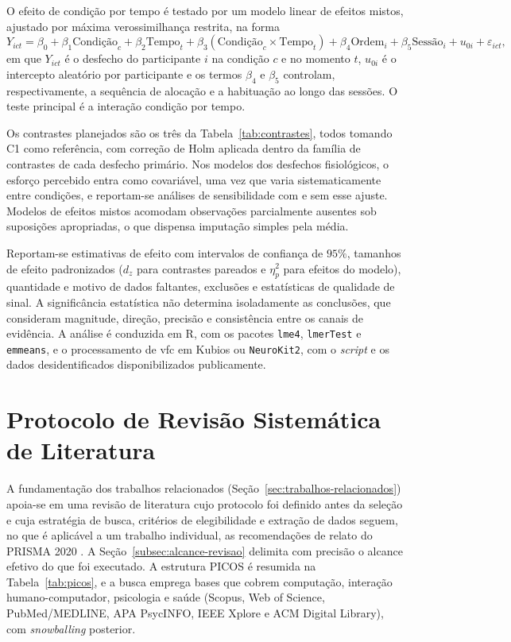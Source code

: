O efeito de condição por tempo é testado por um modelo linear de efeitos mistos, ajustado por máxima verossimilhança restrita, na forma
\begin{equation}
    Y_{ict} = \beta_0 + \beta_1 \mathrm{Condição}_c + \beta_2 \mathrm{Tempo}_t + \beta_3 (\mathrm{Condição}_c \times \mathrm{Tempo}_t) + \beta_4 \mathrm{Ordem}_i + \beta_5 \mathrm{Sessão}_i + u_{0i} + \varepsilon_{ict},
    \label{eq:lmm}
\end{equation}
\noindent em que $Y_{ict}$ é o desfecho do participante $i$ na condição $c$ e no momento $t$, $u_{0i}$ é o intercepto aleatório por participante e os termos $\beta_4$ e $\beta_5$ controlam, respectivamente, a sequência de alocação e a habituação ao longo das sessões. O teste principal é a interação condição por tempo.

Os contrastes planejados são os três da Tabela~\ref{tab:contrastes}, todos tomando C1 como referência, com correção de Holm aplicada dentro da família de contrastes de cada desfecho primário. Nos modelos dos desfechos fisiológicos, o esforço percebido entra como covariável, uma vez que varia sistematicamente entre condições, e reportam-se análises de sensibilidade com e sem esse ajuste. Modelos de efeitos mistos acomodam observações parcialmente ausentes sob suposições apropriadas, o que dispensa imputação simples pela média.

Reportam-se estimativas de efeito com intervalos de confiança de $95\%$, tamanhos de efeito padronizados ($d_z$ para contrastes pareados e $\eta^2_p$ para efeitos do modelo), quantidade e motivo de dados faltantes, exclusões e estatísticas de qualidade de sinal. A significância estatística não determina isoladamente as conclusões, que consideram magnitude, direção, precisão e consistência entre os canais de evidência. A análise é conduzida em R, com os pacotes \texttt{lme4}, \texttt{lmerTest} e \texttt{emmeans}, e o processamento de \gls{vfc} em Kubios ou \texttt{NeuroKit2}, com o \textit{script} e os dados desidentificados disponibilizados publicamente.

\section{Protocolo de Revisão Sistemática de Literatura}\label{sec:rsl}

A fundamentação dos trabalhos relacionados (Seção~\ref{sec:trabalhos-relacionados}) apoia-se em uma revisão de literatura cujo protocolo foi definido antes da seleção e cuja estratégia de busca, critérios de elegibilidade e extração de dados seguem, no que é aplicável a um trabalho individual, as recomendações de relato do PRISMA 2020 \citep{Page2021}. A Seção~\ref{subsec:alcance-revisao} delimita com precisão o alcance efetivo do que foi executado. A estrutura PICOS é resumida na Tabela~\ref{tab:picos}, e a busca emprega bases que cobrem computação, interação humano-computador, psicologia e saúde (Scopus, Web of Science, PubMed/MEDLINE, APA PsycINFO, IEEE Xplore e ACM Digital Library), com \textit{snowballing} posterior.

